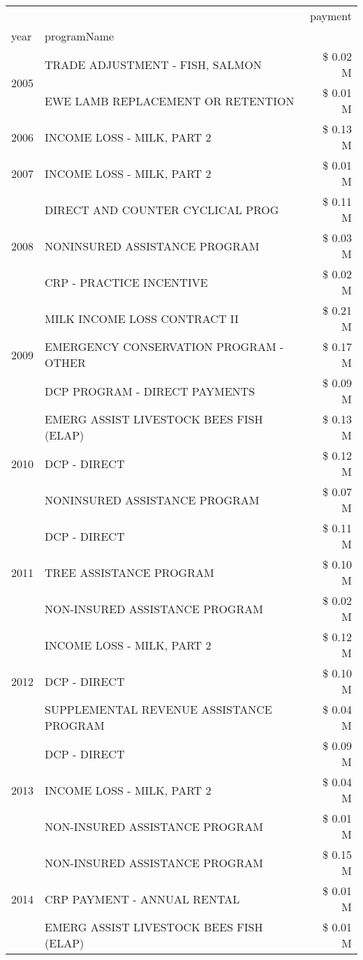 \begin{tabular}{llr}
\toprule
 &  & payment \\
year & programName &  \\
\midrule
\multirow[t]{2}{*}{2005} & TRADE ADJUSTMENT - FISH, SALMON & \$ 0.02 M \\
 & EWE LAMB REPLACEMENT OR RETENTION & \$ 0.01 M \\
\cline{1-3}
2006 & INCOME LOSS - MILK, PART 2 & \$ 0.13 M \\
\cline{1-3}
2007 & INCOME LOSS - MILK, PART 2 & \$ 0.01 M \\
\cline{1-3}
\multirow[t]{3}{*}{2008} & DIRECT AND COUNTER CYCLICAL PROG & \$ 0.11 M \\
 & NONINSURED ASSISTANCE PROGRAM & \$ 0.03 M \\
 & CRP - PRACTICE INCENTIVE & \$ 0.02 M \\
\cline{1-3}
\multirow[t]{3}{*}{2009} & MILK INCOME LOSS CONTRACT II & \$ 0.21 M \\
 & EMERGENCY CONSERVATION PROGRAM - OTHER & \$ 0.17 M \\
 & DCP PROGRAM - DIRECT PAYMENTS & \$ 0.09 M \\
\cline{1-3}
\multirow[t]{3}{*}{2010} & EMERG ASSIST LIVESTOCK BEES FISH (ELAP) & \$ 0.13 M \\
 & DCP - DIRECT & \$ 0.12 M \\
 & NONINSURED ASSISTANCE PROGRAM & \$ 0.07 M \\
\cline{1-3}
\multirow[t]{3}{*}{2011} & DCP - DIRECT & \$ 0.11 M \\
 & TREE ASSISTANCE PROGRAM & \$ 0.10 M \\
 & NON-INSURED ASSISTANCE PROGRAM & \$ 0.02 M \\
\cline{1-3}
\multirow[t]{3}{*}{2012} & INCOME LOSS - MILK, PART 2 & \$ 0.12 M \\
 & DCP - DIRECT & \$ 0.10 M \\
 & SUPPLEMENTAL REVENUE ASSISTANCE PROGRAM & \$ 0.04 M \\
\cline{1-3}
\multirow[t]{3}{*}{2013} & DCP - DIRECT & \$ 0.09 M \\
 & INCOME LOSS - MILK, PART 2 & \$ 0.04 M \\
 & NON-INSURED ASSISTANCE PROGRAM & \$ 0.01 M \\
\cline{1-3}
\multirow[t]{3}{*}{2014} & NON-INSURED ASSISTANCE PROGRAM & \$ 0.15 M \\
 & CRP PAYMENT - ANNUAL RENTAL & \$ 0.01 M \\
 & EMERG ASSIST LIVESTOCK BEES FISH (ELAP) & \$ 0.01 M \\

\end{tabular}
